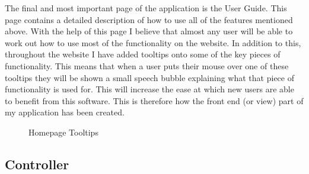 The final and most important page of the application is the User Guide. This page contains a detailed description of how to use all of the features mentioned above. With the help of this page I believe that almost any user will be able to work out how to use most of the functionality on the website. In addition to this, throughout the website I have added tooltips onto some of the key pieces of functionality. This means that when a user puts their mouse over one of these tooltips they will be shown a small speech bubble explaining what that piece of functionality is used for. This will increase the ease at which new users are able to benefit from this software. This is therefore how the front end (or view) part of my application has been created.

\begin{figure}[!ht]
	\centering
	\caption{Homepage Tooltips}
\end{figure}

\subsection{Controller}

